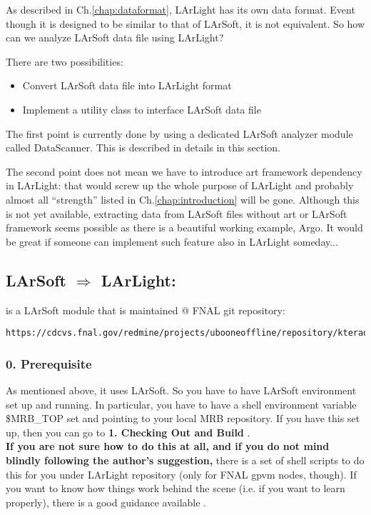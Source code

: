 As described in Ch.\ref{chap:dataformat}, LArLight has its own data format.
Event though it is designed to be similar to that of LArSoft, it is not equivalent.
So how can we analyze LArSoft data file using LArLight?

There are two possibilities:
\begin{itemize}
\item Convert LArSoft data file into LArLight format
\item Implement a utility class to interface LArSoft data file
\end{itemize}
The first point is currently done by using a dedicated LArSoft analyzer module called {\ttfamily DataScanner}. This is described in details in this section.

The second point does not mean we have to introduce {\ttfamily art} framework dependency in LArLight: that would screw up the whole purpose of LArLight and probably almost all ``strength'' listed in Ch.\ref{chap:introduction} will be gone. Although this is not yet available, extracting data from LArSoft files without {\ttfamily art} or LArSoft framework seems possible as there is a beautiful working example, {\ttfamily Argo}. It would be great if someone can implement such feature also in LArLight someday...

\subsection{LArSoft $\Rightarrow$ LArLight: \DataScanner}
 \DataScanner is a LArSoft module that is maintained @ FNAL git repository:
\begin{lstlisting}
https://cdcvs.fnal.gov/redmine/projects/ubooneoffline/repository/kterao/
\end{lstlisting}

\subsubsection{0. Prerequisite}
As mentioned above, it uses LArSoft. So you have to have LArSoft environment set up and running. In particular, you have to have a shell environment variable {\ttfamily \$MRB\_TOP} set and pointing to your local MRB repository. If you have this set up, then you can go to {\bf 1. Checking Out and Build \DataScanner}.\\

{\bf If you are not sure how to do this at all, and if you do not mind blindly following the author's suggestion,} there is a set of shell scripts to do this for you under LArLight repository (only for FNAL gpvm nodes, though). If you want to know how things work behind the scene (i.e. if you want to learn properly), there is a good guidance available \cite{LArDevWiki}.

